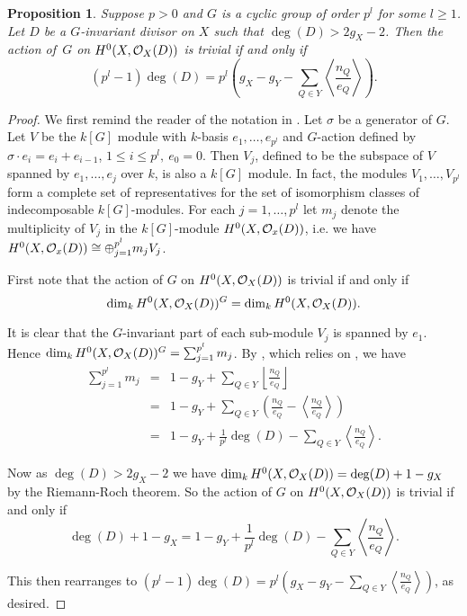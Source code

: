 \documentclass[draft, 11pt]{article} %
\theoremstyle{plain}
\newtheorem{prop}[defn]{Proposition}
\theoremstyle{remark}
\newcommand{\cO}{{\cal O}}
\begin{document}
  \begin{prop}\label{nakaj}
    Suppose $p>0$ and $G$ is a cyclic group of order $p^l$ for some $l\geq 1$.
    Let $D$ be a $G$-invariant divisor on $X$ such that $\deg(D)>2g_X-2$.
    Then the action of~$G$ on $H^0(X,\cO_X(D))$ is trivial if and only if
      \[ 
	(p^l-1)\deg(D)=p^l\left(g_X-g_Y-\sum_{Q\in Y}\left\langle \frac{n_Q}{e_Q} \right\rangle\right).
      \]
  \end{prop}
  \begin{proof}
We first remind the reader of the notation in \cite{kako}.
Let $\sigma$ be a generator of $G$.
Let $V$ be the $k[G]$ module with $k$-basis $e_1,\ldots ,e_{p^l}$ and $G$-action defined by $\sigma\cdot e_i=e_i+e_{i-1}$, $1\leq i \leq p^l,\ e_0=0$.
Then $V_j$, defined to be the subspace of $V$ spanned by $e_1,\ldots ,e_j$ over $k$, is also a $k[G]$ module.
In fact, the modules $V_1,\ldots ,V_{p^l}$ form a complete set of representatives for the set of isomorphism classes of indecomposable $k[G]$-modules. For each $j=1,\ldots,p^l$ let $m_j$ denote the multiplicity of $V_j$ in the $k[G]$-module $H^0(X,\cO_x(D))$, i.e. we have $H^0(X,\cO_x(D))\cong \oplus_{j=1}^{p^l}m_jV_j$.



    First note that the action of $G$ on $H^0(X,\cO_X(D))$ is trivial if and only if
      \begin{equation}\label{triva}
	\dim_k H^0(X,\cO_X(D))^G =\dim_k H^0(X,\cO_X(D)).
      \end{equation}
	
    It is clear that the $G$-invariant part of each sub-module $V_j$ is spanned by $e_1$. 
    Hence $\dim_kH^0(X,\cO_X(D))^G = \sum_{j=1}^{p^l} m_j$.
    By \cite[Thm 2.1]{quaddiffequi}, which relies on \cite{cohogsheaves}, we have
      \begin{eqnarray*}
	\sum_{j=1}^{p^l} m_j & = & 1- g_Y +\sum_{Q\in Y} \left\lfloor \frac{n_Q}{e_Q}\right\rfloor\\
	& = & 1- g_Y + \sum_{Q\in Y} \left( \frac{n_Q}{e_Q} - \left\langle \frac{n_Q}{e_Q}\right\rangle \right) \\
  	& = & 1 - g_Y + \frac{1}{p^l}\deg(D) - \sum_{Q\in Y} \left\langle \frac{n_Q}{e_Q} \right\rangle.
      \end{eqnarray*}

    Now as $\deg(D)>2g_X-2$ we have $\dim_kH^0(X,\cO_X(D)) =\deg(D)+1-g_X$ by the Riemann-Roch theorem. 
    So the action of $G$ on $H^0(X,\cO_X(D))$ is trivial if and only if
      \begin{equation*}
	\deg(D)+1-g_X  = 1 - g_Y + \frac{1}{p^l}\deg(D) - \sum_{Q\in Y}\left\langle \frac{n_Q}{e_Q} \right\rangle. \label{hi}
      \end{equation*}

    This then rearranges to $(p^l-1)\deg(D)=p^l\left(g_X-g_Y-\sum_{Q\in Y}\left\langle \frac{n_Q}{e_Q} \right\rangle\right)$, as desired.
    \end{proof}
\end{document}
